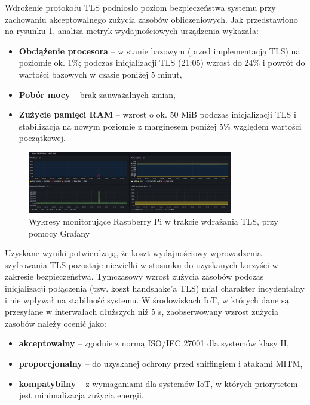 Wdrożenie protokołu TLS podniosło poziom bezpieczeństwa systemu przy zachowaniu akceptowalnego zużycia zasobów obliczeniowych. Jak przedstawiono na rysunku \ref{fig:Wykresy monitorujące Raspberry Pi w trakcie wdrażania TLS, przy pomocy Grafany}, analiza metryk wydajnościowych urządzenia wykazała:
\begin{itemize}
    \item \textbf{Obciążenie procesora} – w stanie bazowym (przed implementacją TLS) na poziomie ok. 1\%; podczas inicjalizacji TLS (21:05) wzrost do 24\% i powrót do wartości bazowych w czasie poniżej 5 minut,
    \item \textbf{Pobór mocy} – brak zauważalnych zmian,
    \item \textbf{Zużycie pamięci RAM} – wzrost o ok. 50 MiB podczas inicjalizacji TLS i stabilizacja na nowym poziomie z marginesem poniżej 5\% względem wartości początkowej.
\end{itemize}

\begin{figure}[h]
    \centering
    \includegraphics[width=0.8\textwidth]{pictures/raspberry-tls.png}
    \caption{Wykresy monitorujące Raspberry Pi w trakcie wdrażania TLS, przy pomocy Grafany} 
    \label{fig:Wykresy monitorujące Raspberry Pi w trakcie wdrażania TLS, przy pomocy Grafany}
\end{figure}

Uzyskane wyniki potwierdzają, że koszt wydajnościowy wprowadzenia szyfrowania TLS pozostaje niewielki w stosunku do uzyskanych korzyści w zakresie bezpieczeństwa. Tymczasowy wzrost zużycia zasobów podczas inicjalizacji połączenia (tzw. koszt handshake'a TLS) miał charakter incydentalny i nie wpływał na stabilność systemu. W środowiskach IoT, w których dane są przesyłane w interwałach dłuższych niż 5 s, zaobserwowany wzrost zużycia zasobów należy ocenić jako:
\begin{itemize}
    \item \textbf{akceptowalny} – zgodnie z normą ISO/IEC 27001 dla systemów klasy II,
    \item \textbf{proporcjonalny} – do uzyskanej ochrony przed sniffingiem i atakami MITM,
    \item \textbf{kompatybilny} – z wymaganiami dla systemów IoT, w których priorytetem jest minimalizacja zużycia energii.
\end{itemize}

